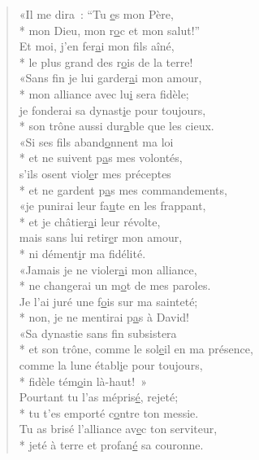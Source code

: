 \begin{verse}
«Il me dira : “Tu \underline{e}s mon Père, \\*
mon Dieu, mon r\underline{o}c et mon salut!” \\
Et moi, j’en fer\underline{a}i mon fils aîné, \\*
le plus grand des r\underline{o}is de la terre! \\

«Sans fin je lui garder\underline{a}i mon amour, \\*
mon alliance avec lu\underline{i} sera fidèle; \\
je fonderai sa dynast\underline{i}e pour toujours, \\*
son trône aussi dur\underline{a}ble que les cieux. \\

«Si ses fils aband\underline{o}nnent ma loi \\*
et ne suivent p\underline{a}s mes volontés, \\
s’ils osent viol\underline{e}r mes préceptes \\*
et ne gardent p\underline{a}s mes commandements, \\

«je punirai leur fa\underline{u}te en les frappant, \\*
et je châtier\underline{a}i leur révolte, \\
mais sans lui retir\underline{e}r mon amour, \\*
ni dément\underline{i}r ma fidélité. \\

«Jamais je ne violer\underline{a}i mon alliance, \\*
ne changerai un m\underline{o}t de mes paroles. \\
Je l’ai juré une f\underline{o}is sur ma sainteté; \\*
non, je ne mentirai p\underline{a}s à David! \\

«Sa dynastie sans f\underline{i}n subsistera \\*
et son trône, comme le sol\underline{e}il en ma présence, \\
comme la lune établ\underline{i}e pour toujours, \\*
fidèle tém\underline{o}in là-haut! » \\

Pourtant tu l’as mépris\underline{é}, rejeté; \\*
tu t’es emporté c\underline{o}ntre ton messie. \\
Tu as brisé l’alliance av\underline{e}c ton serviteur, \\*
jeté à terre et profan\underline{é} sa couronne. \\


\end{verse}
